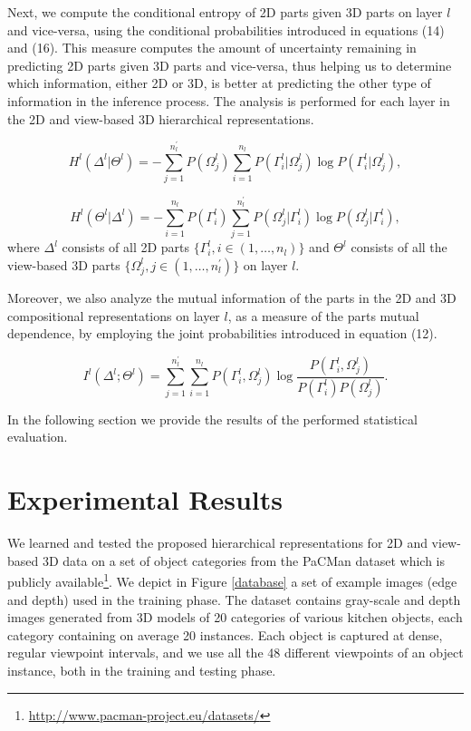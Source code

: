 \documentclass[runningheads]{llncs}
\begin{document}
Next, we compute the conditional entropy of 2D parts given 3D parts on layer $l$ and vice-versa, using the conditional probabilities introduced in equations (14) and (16). This measure computes the amount of uncertainty remaining in predicting 2D parts given 3D parts and vice-versa, thus helping us to determine which information, either 2D or 3D, is better at predicting the other type of information in the inference process. The analysis is performed for each layer in the 2D and view-based 3D hierarchical representations.

\begin{equation}
 H^l(\Delta^l|\Theta^l) = -\sum\limits_{j=1}^{n_l^{'}}P({\Omega_j^l})\sum\limits_{i=1}^{n_l}P(\Gamma_i^l|\Omega_j^l)\log P(\Gamma_i^l|\Omega_j^l), 
\end{equation}

\begin{equation}
 H^l(\Theta^l|\Delta^l) = -\sum\limits_{i=1}^{n_l}P({\Gamma_i^l})\sum\limits_{j=1}^{n_l^{'}}P(\Omega_j^l|\Gamma_i^l)\log P(\Omega_j^l|\Gamma_i^l),
\end{equation}
where $\Delta^l$ consists of all 2D parts $\{\Gamma_i^l, i \in (1,\ldots,n_l)\}$ and $\Theta^l$ consists of all the view-based 3D parts $\{\Omega_j^l, j \in (1,\ldots,n_l^{'})\}$ on layer $l$.

Moreover, we also analyze the mutual information of the parts in the 2D and 3D compositional representations on layer $l$, as a measure of the parts mutual dependence, by employing the joint probabilities introduced in equation (12).

\begin{equation}
 I^l(\Delta^l;\Theta^l) = \sum\limits_{j=1}^{n_l^{'}}\sum\limits_{i=1}^{n_l}P({\Gamma_i^l},\Omega_j^l)\log \frac{P({\Gamma_i^l},\Omega_j^l)}{P({\Gamma_i^l})P(\Omega_j^l)}.
\end{equation}

In the following section we provide the results of the performed statistical evaluation.

\section{Experimental Results}
\label{sec:results}

We learned and tested the proposed hierarchical representations for 2D and view-based 3D data on a set of object categories from the PaCMan dataset which is publicly available\footnote{\url{http://www.pacman-project.eu/datasets/}}. We depict in Figure \ref{database} a set of example images (edge and depth) used in the training phase. The dataset contains gray-scale and depth images generated from 3D models of 20 categories of various kitchen objects, each category containing on average 20 instances. Each object is captured at dense, regular viewpoint intervals, and we use all the 48 different viewpoints of an object instance, both in the training and testing phase.
\end{document}
